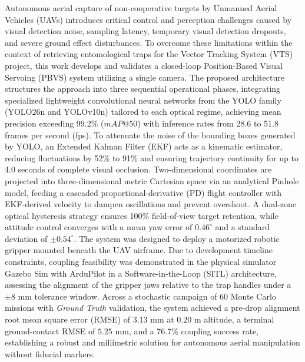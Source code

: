 Autonomous aerial capture of non-cooperative targets by Unmanned Aerial Vehicles (UAVs) introduces critical control and perception challenges caused by visual detection noise, sampling latency, temporary visual detection dropouts, and severe ground effect disturbances. To overcome these limitations within the context of retrieving entomological traps for the Vector Tracking System (VTS) project, this work develops and validates a closed-loop Position-Based Visual Servoing (PBVS) system utilizing a single camera. The proposed architecture structures the approach into three sequential operational phases, integrating specialized lightweight convolutional neural networks from the YOLO family (YOLO26n and YOLOv10n) tailored to each optical regime, achieving mean precision exceeding 99.2\% ($mAP@50$) with inference rates from 28.6 to 51.8 frames per second (fps). To attenuate the noise of the bounding boxes generated by YOLO, an Extended Kalman Filter (EKF) acts as a kinematic estimator, reducing fluctuations by 52\% to 91\% and ensuring trajectory continuity for up to 4.0 seconds of complete visual occlusion. Two-dimensional coordinates are projected into three-dimensional metric Cartesian space via an analytical Pinhole model, feeding a cascaded proportional-derivative (PD) flight controller with EKF-derived velocity to dampen oscillations and prevent overshoot. A dual-zone optical hysteresis strategy ensures 100\% field-of-view target retention, while attitude control converges with a mean yaw error of $0.46^\circ$ and a standard deviation of $\pm 0.54^\circ$. The system was designed to deploy a motorized robotic gripper mounted beneath the UAV airframe. Due to development timeline constraints, coupling feasibility was demonstrated in the physical simulator Gazebo Sim with ArduPilot in a Software-in-the-Loop (SITL) architecture, assessing the alignment of the gripper jaws relative to the trap handles under a $\pm 8\text{ mm}$ tolerance window. Across a stochastic campaign of 60 Monte Carlo missions with \textit{Ground Truth} validation, the system achieved a pre-drop alignment root mean square error (RMSE) of $3.13\text{ mm}$ at $0.20\text{ m}$ altitude, a terminal ground-contact RMSE of $5.25\text{ mm}$, and a 76.7\% coupling success rate, establishing a robust and millimetric solution for autonomous aerial manipulation without fiducial markers.
